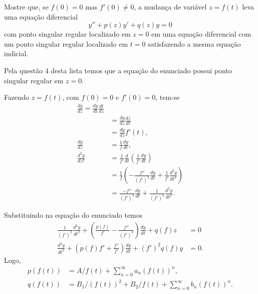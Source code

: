 \documentclass[a4paper,12pt, leqno, answers]{exam}
\begin{document}
\begin{questions}
    \question Mostre que, se $f(0) = 0$ mas $f'(0) \neq 0$, a mudan\c{c}a de vari\'{a}vel $z = f(t)$ leva uma equa\c{c}\~{a}o diferencial
    \[
    y'' + p(z) y' + q(z) y = 0
    \]
    com ponto singular regular localizado em $z = 0$ em uma equa\c{c}\~{a}o diferencial com um ponto singular regular localizado em $t = 0$ satisfazendo a mesma equa\c{c}\~{a}o indicial.
    \begin{solution}
        Pela quest\~{a}o 4 desta lista temos que a equa\c{c}\~{a}o do enunciado possui ponto singular regular em $z = 0$.

        Fazendo $z = f(t)$, com $f(0) = 0$ e $f'(0) = 0$, tem-se
        \begin{align*}
            \frac{d y}{d z} = \frac{d y}{d t} \frac{d t}{d z} \\
            &= \frac{d y}{d z} \frac{d z}{d t} \\
            &= \frac{d y}{d z} f'(t), \\
            \frac{d y}{d z} &= \frac{1}{f} \frac{d y}{d t}, \\
            \frac{d^2 y}{d z^2} &= \frac{1}{f'} \frac{d}{d t} \left( \frac{1}{f'} \frac{d y}{d t} \right) \\
            &= \frac{1}{f} \left( - \frac{f''}{\left( f' \right)^2} \frac{d y}{d t} + \frac{1}{f'} \frac{d^2 y}{d t^2} \right) \\
            &= \frac{-f''}{\left( f' \right)^3} \frac{d y}{d t} + \frac{1}{\left( f' \right)^2} \frac{d^2 y}{d t^2}.
        \end{align*}
        
        Substituindo na equa\c{c}\~{a}o do enunciado temos
        \begin{align*}
            \frac{1}{\left( f' \right)^2} \frac{d^2 y}{d t^2} + \left( \frac{p\left( f \right)}{f'} - \frac{f''}{\left( f' \right)^3} \right) \frac{d y}{d t} + q\left( f \right) z &= 0 \\
            \frac{d^2 y}{d t^2} + \left( p(f) f' + \frac{f''}{f'} \right) \frac{d y}{d t} + \left( f' \right)^2 q(f) y &= 0. 
        \end{align*}
        Logo,
        \begin{align*}
            p(f(t)) &= A / f(t) + \sum_{n = 0}^\infty a_n \left( f(t) \right)^n, \\
            q(f(t)) &= B_1 / \left( f(t) \right)^2 + B_2 / f(t) + \sum_{n = 0}^\infty b_n \left( f(t) \right)^n.
        \end{align*}


\end{solution}
\end{questions}
\end{document}
